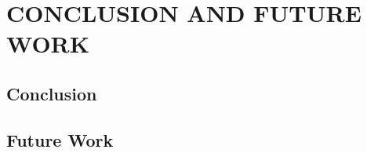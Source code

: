 \chapter{CONCLUSION AND FUTURE WORK}
\label{chap:conclusion}

\section{Conclusion}

\section{Future Work}

